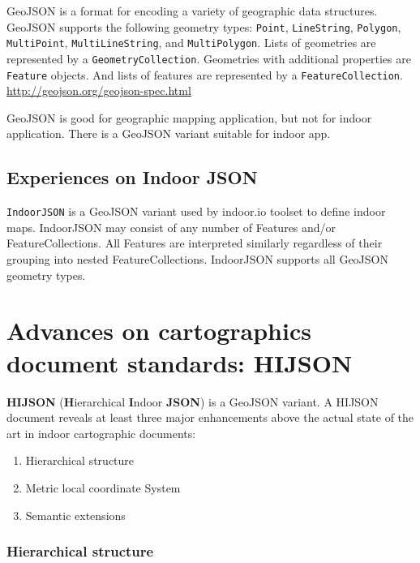 \documentclass[]{article}
\begin{document}
GeoJSON is a format for encoding a variety of geographic data
structures. GeoJSON supports the following geometry types:
\texttt{Point}, \texttt{LineString}, \texttt{Polygon},
\texttt{MultiPoint}, \texttt{MultiLineString}, and
\texttt{MultiPolygon}. Lists of geometries are represented by a
\texttt{GeometryCollection}. Geometries with additional properties are
\texttt{Feature} objects. And lists of features are represented by a
\texttt{FeatureCollection}.
\href{GeoJSON\%20spec}{http://geojson.org/geojson-spec.html}

GeoJSON is good for geographic mapping application, but not for indoor
application. There is a GeoJSON variant suitable for indoor app.

\subsection{Experiences on Indoor
JSON}\label{experiences-on-indoor-json}

\texttt{IndoorJSON} is a GeoJSON variant used by indoor.io toolset to
define indoor maps. IndoorJSON may consist of any number of Features
and/or FeatureCollections. All Features are interpreted similarly
regardless of their grouping into nested FeatureCollections. IndoorJSON
supports all GeoJSON geometry types.

\section{Advances on cartographics document standards:
HIJSON}\label{advances-on-cartographics-document-standards-hijson}

\textbf{HIJSON} (\textbf{H}ierarchical \textbf{I}ndoor \textbf{JSON}) is
a GeoJSON variant. A HIJSON document reveals at least three major
enhancements above the actual state of the art in indoor cartographic
documents:

\begin{enumerate}
\def\labelenumi{\arabic{enumi}.}
\itemsep1pt\parskip0pt
\item
  Hierarchical structure
\item
  Metric local coordinate System
\item
  Semantic extensions
\end{enumerate}

\subsubsection{Hierarchical structure}\label{hierarchical-structure}
\end{document}
